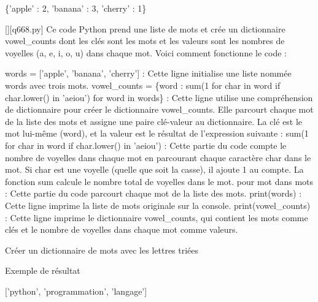 \{'apple' : 2, 'banana' : 3, 'cherry' : 1\}
        \par
        \begin{solution}
            \renewcommand{\nomfichier}{q668.py}
            \pythonfile{\chemincode \nomfichier}[][\nomfichier]
            Ce code Python prend une liste de mots et crée un dictionnaire vowel\_counts dont les clés sont les mots et les valeurs sont les nombres de voyelles (a, e, i, o, u) dans chaque mot. Voici comment fonctionne le code :

    words = ['apple', 'banana', 'cherry'] : Cette ligne initialise une liste nommée words avec trois mots.
    vowel\_counts = \{word : sum(1 for char in word if char.lower() in 'aeiou') for word in words\} : Cette ligne utilise une compréhension de dictionnaire pour créer le dictionnaire vowel\_counts. Elle parcourt chaque mot de la liste des mots et assigne une paire clé-valeur au dictionnaire. La clé est le mot lui-même (word), et la valeur est le résultat de l'expression suivante :
        sum(1 for char in word if char.lower() in 'aeiou') : Cette partie du code compte le nombre de voyelles dans chaque mot en parcourant chaque caractère char dans le mot. Si char est une voyelle (quelle que soit la casse), il ajoute 1 au compte. La fonction sum calcule le nombre total de voyelles dans le mot.
        pour mot dans mots : Cette partie du code parcourt chaque mot de la liste des mots.
    print(words) : Cette ligne imprime la liste de mots originale sur la console.
    print(vowel\_counts) : Cette ligne imprime le dictionnaire vowel\_counts, qui contient les mots comme clés et le nombre de voyelles dans chaque mot comme valeurs.
        \end{solution}
        

        \question
        Créer un dictionnaire de mots avec les lettres triées

Exemple de résultat

['python', 'programmation', 'langage']


